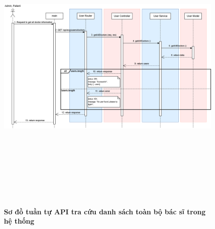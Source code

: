 \begin{figure}[H]
	\centering
	\includegraphics[width=15cm,height=15cm]{Images/api_sequence/user/getAllDoctors.drawio.png}
	\caption[Sơ đồ tuần tự API tra cứu danh sách toàn bộ bác sĩ trong hệ thống]{\bfseries \fontsize{12pt}{0pt}\selectfont Sơ đồ tuần tự API tra cứu danh sách toàn bộ bác sĩ trong hệ thống}
	\label{sequence_diagram_get_all_doctors}
\end{figure}

